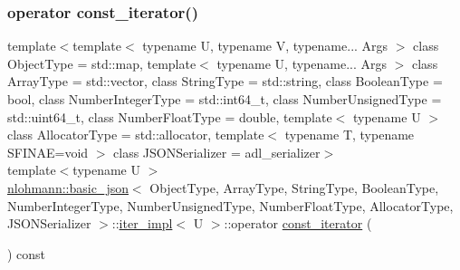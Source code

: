 \subsubsection{\texorpdfstring{operator const\_iterator()}{operator const\_iterator()}}
{\footnotesize\ttfamily template$<$template$<$ typename U, typename V, typename... Args $>$ class Object\+Type = std\+::map, template$<$ typename U, typename... Args $>$ class Array\+Type = std\+::vector, class String\+Type  = std\+::string, class Boolean\+Type  = bool, class Number\+Integer\+Type  = std\+::int64\+\_\+t, class Number\+Unsigned\+Type  = std\+::uint64\+\_\+t, class Number\+Float\+Type  = double, template$<$ typename U $>$ class Allocator\+Type = std\+::allocator, template$<$ typename T, typename S\+F\+I\+N\+A\+E=void $>$ class J\+S\+O\+N\+Serializer = adl\+\_\+serializer$>$ \\
template$<$typename U $>$ \\
\mbox{\hyperlink{classnlohmann_1_1basic__json}{nlohmann\+::basic\+\_\+json}}$<$ Object\+Type, Array\+Type, String\+Type, Boolean\+Type, Number\+Integer\+Type, Number\+Unsigned\+Type, Number\+Float\+Type, Allocator\+Type, J\+S\+O\+N\+Serializer $>$\+::\mbox{\hyperlink{classnlohmann_1_1basic__json_1_1iter__impl}{iter\+\_\+impl}}$<$ U $>$\+::operator \mbox{\hyperlink{classnlohmann_1_1basic__json_a41a70cf9993951836d129bb1c2b3126a}{const\+\_\+iterator}} (\begin{DoxyParamCaption}{ }\end{DoxyParamCaption}) const\hspace{0.3cm}{\ttfamily [inline]}}

\mbox{\label{classnlohmann_1_1basic__json_1_1iter__impl_af6f10c91f59565b6c6e7205ab6969a89}} 
